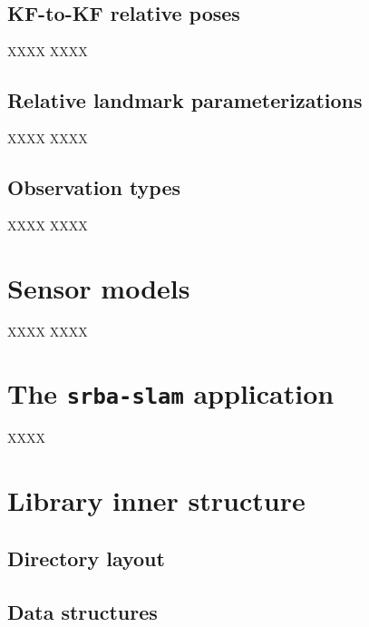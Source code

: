 \documentclass[a4paper,11pt]{article}
\begin{document}
\subsection{KF-to-KF relative poses}

XXXX XXXX 

\subsection{Relative landmark parameterizations}

XXXX XXXX 

\subsection{Observation types}

XXXX XXXX 


\section{Sensor models}
\label{sect:program_sensors}

XXXX XXXX 


\section{The \texttt{srba-slam} application}
\label{sect:srba_slam_app}

XXXX


\section{Library inner structure}

\subsection{Directory layout}


\subsection{Data structures}
\end{document}
